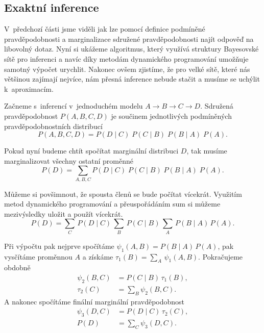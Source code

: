 \subsection{Exaktní inference}

V~předchozí části jsme viděli jak lze pomocí definice podmíněné pravděpodobnosti a marginalizace sdružené pravděpodobnosti najít odpověď na libovolný dotaz. 
Nyní si ukážeme algoritmus, který využívá struktury Bayesovské sítě pro inferenci a navíc díky metodám dynamického programování umožňuje samotný výpočet urychlit.
Nakonec ovšem zjistíme, že pro velké sítě, které nás většinou zajímají nejvíce, nám přesná inference nebude stačit a musíme se uchýlit k~aproximacím.

Začneme s~inferencí v~jednoduchém modelu $A \rightarrow B \rightarrow C \rightarrow D$.
Sdružená pravděpodobnost $P(A, B, C, D)$ je součinem jednotlivých podmíněných pravděpodobnostních distribucí
\begin{equation}
P(A, B, C, D) = P(D \mid C)\; P(C \mid B) \;P(B \mid A) \;P(A).
\end{equation}

Pokud nyní budeme chtít spočítat marginální distribuci $D$, tak musíme marginalizovat všechny ostatní proměnné
\begin{equation}
P(D) = \sum_{A, B, C} P(D \mid C) \; P(C \mid B) \; P(B \mid A) \;P(A).
\end{equation}

Můžeme si povšimnout, že spousta členů se bude počítat vícekrát.
Využitím metod dynamického programování a přeuspořádáním sum si můžeme mezivýsledky uložit a použít vícekrát.
\begin{equation}
P(D) = \sum_C \, P(D \mid C) \,\sum_B \,P(C \mid B) \,\sum_A \,P(B \mid A) \,P(A).
\end{equation}

Při výpočtu pak nejprve spočítáme $\psi_1(A, B) =  P(B \mid A) \, P(A)$,  pak vysčítáme proměnnou $A$ a získáme $\tau_1(B) = \sum_A \,\psi_1(A, B)$.
Pokračujeme obdobně
\begin{align}
    \psi_2(B, C) &= P(C \mid B) \,\tau_1(B), \\
    \tau_2(C) &= \sum_B \psi_2(B, C).
\end{align}
A nakonec spočítáme finální marginální pravděpodobnost
\begin{align}
    \psi_3(D, C) &= P(D \mid C) \, \tau_2(C), \\
    P(D) &= \sum_C \psi_3(D, C).
\end{align}

